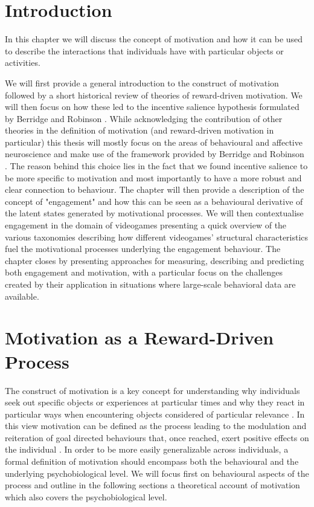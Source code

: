\section{Introduction}
\label{motivation_engagement_introduction}
In this chapter we will discuss the concept of motivation and how it can be used to describe the interactions that individuals have with particular objects or activities. 

We will first provide a general introduction to the construct of motivation followed by a short historical review of theories of reward-driven motivation. We will then focus on how these led to the incentive salience hypothesis formulated by Berridge and Robinson \cite{berridge1998role}. While acknowledging the contribution of other theories in the definition of motivation (and reward-driven motivation in particular) this thesis will mostly focus on the areas of behavioural and affective neuroscience and make use of the framework provided by Berridge and Robinson \cite{berridge1998role}. The reason behind this choice lies in the fact that we found incentive salience to be more specific to motivation and most importantly to have a more robust and clear connection to behaviour. The chapter will then provide a description of the concept of "engagement" and how this can be seen as a behavioural derivative of the latent states generated by motivational processes. We will then contextualise engagement in the domain of videogames presenting a quick overview of the various taxonomies describing how different videogames' structural characteristics fuel the motivational processes underlying the engagement behaviour. The chapter closes by presenting approaches for measuring, describing and predicting both engagement and motivation, with a particular focus on the challenges created by their application in situations where large-scale behavioral data are available.

\section{Motivation as a Reward-Driven Process}
\label{motivation}
The construct of motivation is a key concept for understanding why individuals seek out specific objects or experiences at particular times and why they react in particular ways when encountering objects considered of particular relevance \cite{berridge2004motivation}. In this view motivation can be defined as the process leading to the modulation and reiteration of goal directed behaviours that, once reached, exert positive effects on the individual \cite{simpson2016behavioral}. In order to be more easily generalizable across individuals, a formal definition of motivation should encompass both the behavioural and the underlying psychobiological level. We will focus first on behavioural aspects of the process and outline in the following sections a theoretical account of motivation which also covers the psychobiological level. 

